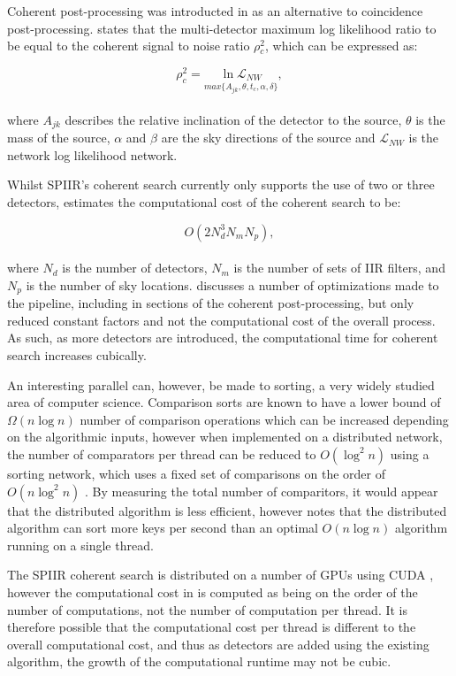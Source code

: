\documentclass{article}
\begin{document}
Coherent post-processing was introducted in \cite{ChuThesis} as an alternative to coincidence
post-processing. \cite{ChuThesis} states that the multi-detector maximum log likelihood ratio to be
equal to the coherent signal to noise ratio \(\rho{}^2_c\), which can be expressed as:

\begin{equation}
    \rho^2_c = \underset{max\{A_{jk},\theta,t_{c},\alpha,\delta\}}{\ln \mathcal{L}_{NW}},
\end{equation}
\\
where \(A_{jk}\) describes the relative inclination of the detector to the source, \(\theta\) is the
mass of the source, \(\alpha\) and \(\beta\) are the sky directions of the source and
\(\mathcal{L}_{NW}\) is the network log likelihood network.

Whilst SPIIR's coherent search currently only supports the use of two or three detectors,
\cite{ChuThesis} estimates the computational cost of the coherent search to be:

\begin{equation}
    O(2N^3_dN_mN_p),
\end{equation}
\\
where \(N_d\) is the number of detectors, \(N_m\) is the number of sets of IIR filters, and \(N_p\)
is the number of sky locations. \cite{SPIIRGPU2018} discusses a number of optimizations made to the
pipeline, including in sections of the coherent post-processing, but only reduced constant factors
and not the computational cost of the overall process. As such, as more detectors are introduced,
the computational time for coherent search increases cubically.

An interesting parallel can, however, be made to sorting, a very widely studied area of computer
science. Comparison sorts are known to have a lower bound of \(\Omega{}(n\log{n})\) number of
comparison operations \cite{CLRS} which can be increased depending on the algorithmic inputs,
however when implemented on a distributed network, the number of comparators per thread can be
reduced to \(O(\log^2{n})\) using a sorting network, which uses a fixed set of comparisons on the
order of \(O(n\log^2{n})\) \cite{nvidia}. By measuring the total number of comparitors, it would
appear that the distributed algorithm is less efficient, however \cite{nvidia} notes that the
distributed algorithm can sort more keys per second than an optimal \(O(n\log{n})\) algorithm
running on a single thread.

The SPIIR coherent search is distributed on a number of GPUs using CUDA \cite{SPIIRGPU2018}, however
the computational cost in \cite{ChuThesis} is computed as being on the order of the number of
computations, not the number of computation per thread. It is therefore possible that the
computational cost per thread is different to the overall computational cost, and thus as detectors
are added using the existing algorithm, the growth of the computational runtime may not be cubic.
\end{document}
